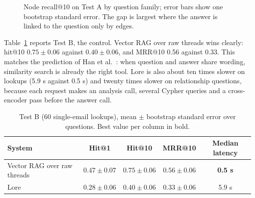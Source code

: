 \documentclass[12pt,onecolumn,draftclsnofoot]{IEEEtran}
\begin{document}
\begin{figure}[t]
\centering
{}
\caption{Node recall@10 on Test A by question family; error bars show one bootstrap standard error. The gap is largest where the answer is linked to the question only by edges.}
\label{fig:families}
\end{figure}

Table~\ref{tab:testb} reports Test B, the control. Vector RAG over raw threads wins clearly: hit@10 $0.75 \pm 0.06$ against $0.40 \pm 0.06$, and MRR@10 0.56 against 0.33. This matches the prediction of Han et al.\ \cite{han2025ragvsgraphrag}: when question and answer share wording, similarity search is already the right tool. Lore is also about ten times slower on lookups (5.9 s against 0.5 s) and twenty times slower on relationship questions, because each request makes an analysis call, several Cypher queries and a cross-encoder pass before the answer call.

\begin{table}[t]
\centering
\caption{Test B (60 single-email lookups), mean $\pm$ bootstrap standard error over questions. Best value per column in bold.}
\label{tab:testb}
\footnotesize
\begin{tabular}{@{}lcccc@{}}
\toprule
System & Hit@1 & Hit@10 & MRR@10 & Median latency \\
\midrule
Vector RAG over raw threads & $\mathbf{0.47} \pm 0.07$ & $\mathbf{0.75} \pm 0.06$ & $\mathbf{0.56} \pm 0.06$ & \textbf{0.5 s} \\
Lore & $0.28 \pm 0.06$ & $0.40 \pm 0.06$ & $0.33 \pm 0.06$ & 5.9 s \\
\bottomrule
\end{tabular}
\end{table}
\end{document}
